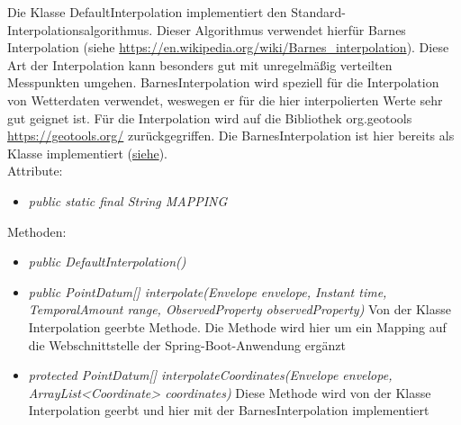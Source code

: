     Die Klasse DefaultInterpolation implementiert den Standard-Interpolationsalgorithmus.
    Dieser Algorithmus verwendet hierfür Barnes Interpolation (siehe \url{https://en.wikipedia.org/wiki/Barnes_interpolation}).
    Diese Art der Interpolation kann besonders gut mit unregelmäßig verteilten Messpunkten umgehen.
    BarnesInterpolation wird speziell für die Interpolation von Wetterdaten verwendet, weswegen er für die hier interpolierten Werte sehr gut geignet ist.
    Für die Interpolation wird auf die Bibliothek org.geotools \url{https://geotools.org/} zurückgegriffen.
    Die BarnesInterpolation ist hier bereits als Klasse implementiert (\href{http://docs.geotools.org/latest/javadocs/org/geotools/process/vector/BarnesSurfaceInterpolator.html}{siehe}).
\\
Attribute:
\begin{itemize}
    \item \emph{public static final String MAPPING} \mappingDescription
\end{itemize}
Methoden:
\begin{itemize}
    \item \emph{public DefaultInterpolation()}
    \item \emph{public PointDatum[] interpolate(Envelope envelope, Instant time, TemporalAmount range, ObservedProperty observedProperty)}
    Von der Klasse Interpolation geerbte Methode. Die Methode wird hier um ein Mapping auf die Webschnittstelle der Spring-Boot-Anwendung ergänzt
   \item \emph{protected PointDatum[] interpolateCoordinates(Envelope envelope, ArrayList<Coordinate> coordinates)}
    Diese Methode wird von der Klasse Interpolation geerbt und hier mit der BarnesInterpolation implementiert
\end{itemize}
